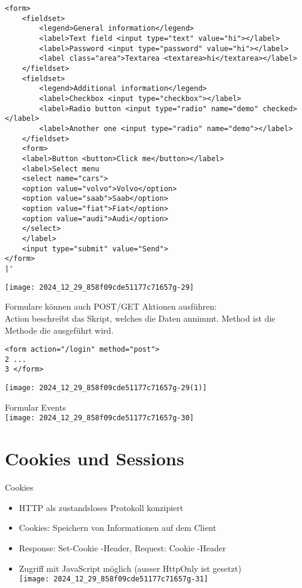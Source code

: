 \begin{verbatim}
<form>
    <fieldset>
        <legend>General information</legend>
        <label>Text field <input type="text" value="hi"></label>
        <label>Password <input type="password" value="hi"></label>
        <label class="area">Textarea <textarea>hi</textarea></label>
    </fieldset>
    <fieldset>
        <legend>Additional information</legend>
        <label>Checkbox <input type="checkbox"></label>
        <label>Radio button <input type="radio" name="demo" checked></label>
        <label>Another one <input type="radio" name="demo"></label>
    </fieldset>
    <form>
    <label>Button <button>Click me</button></label>
    <label>Select menu
    <select name="cars">
    <option value="volvo">Volvo</option>
    <option value="saab">Saab</option>
    <option value="fiat">Fiat</option>
    <option value="audi">Audi</option>
    </select>
    </label>
    <input type="submit" value="Send">
</form>
|'
\end{verbatim}

\begin{center}
\texttt{[image: 2024\_12\_29\_858f09cde51177c71657g-29]}
\end{center}

Formulare können auch POST/GET Aktionen ausführen:\\
Action beschreibt das Skript, welches die Daten annimmt. Method ist die Methode die ausgeführt wird.

\begin{verbatim}
<form action="/login" method="post">
2 ...
3 </form>
\end{verbatim}

\begin{center}
\texttt{[image: 2024\_12\_29\_858f09cde51177c71657g-29(1)]}
\end{center}

Formular Events\\
\texttt{[image: 2024\_12\_29\_858f09cde51177c71657g-30]}

\section*{Cookies und Sessions}
Cookies

\begin{itemize}
  \item HTTP als zustandsloses Protokoll konzipiert
  \item Cookies: Speichern von Informationen auf dem Client
  \item Response: Set-Cookie -Header, Request: Cookie -Header
  \item Zugriff mit JavaScript möglich (ausser HttpOnly ist gesetzt)\\
\texttt{[image: 2024\_12\_29\_858f09cde51177c71657g-31]}
\end{itemize}

